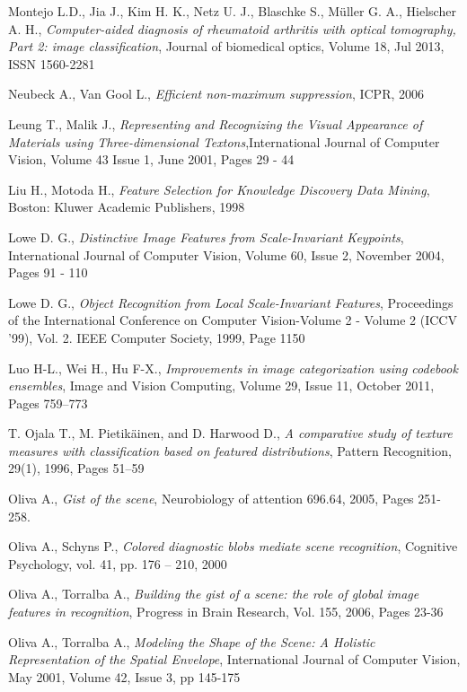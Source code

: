 \begin{thebibliography}{100}
 Montejo L.D., Jia J., Kim H. K., Netz U. J., Blaschke S., Müller G. A., Hielscher A. H., \emph{Computer-aided diagnosis of rheumatoid arthritis with optical tomography, Part 2: image classification}, Journal of biomedical optics, Volume 18, Jul 2013, ISSN 1560-2281

 Neubeck A., Van Gool L., \emph{Efficient non-maximum suppression}, ICPR, 2006

 Leung T., Malik J., \emph{Representing and Recognizing the Visual Appearance of Materials using Three-dimensional Textons},International Journal of Computer Vision, Volume 43 Issue 1, June 2001, Pages 29 - 44 

 Liu H., Motoda H., \emph{Feature Selection for Knowledge Discovery Data Mining}, Boston: Kluwer Academic Publishers, 1998

 Lowe D. G., \emph{Distinctive Image Features from Scale-Invariant Keypoints}, International Journal of Computer Vision, Volume 60, Issue 2, November 2004, Pages 91 - 110 

 Lowe D. G., \emph{Object Recognition from Local Scale-Invariant Features}, Proceedings of the International Conference on Computer Vision-Volume 2 - Volume 2 (ICCV '99), Vol. 2. IEEE Computer Society, 1999, Page 1150

 Luo H-L., Wei H., Hu F-X., \emph{Improvements in image categorization using codebook ensembles}, Image and Vision Computing, Volume 29, Issue 11, October 2011, Pages 759–773

 T. Ojala T., M. Pietikäinen, and D. Harwood D., \emph{A comparative study of texture measures with classification based on featured distributions}, Pattern Recognition, 29(1), 1996, Pages 51–59

 Oliva A., \emph{Gist of the scene}, Neurobiology of attention 696.64, 2005, Pages 251-258.

 Oliva A., Schyns P., \emph{Colored diagnostic blobs mediate scene recognition}, Cognitive Psychology, vol. 41, pp. 176 – 210, 2000

 Oliva A., Torralba A., \emph{Building the gist of a scene: the role of global image features in recognition}, Progress in Brain Research, Vol. 155, 2006, Pages 23-36

 Oliva A., Torralba A., \emph{Modeling the Shape of the Scene: A Holistic Representation of the Spatial Envelope}, International Journal of Computer Vision, May 2001, Volume 42, Issue 3, pp 145-175


\end{thebibliography}

